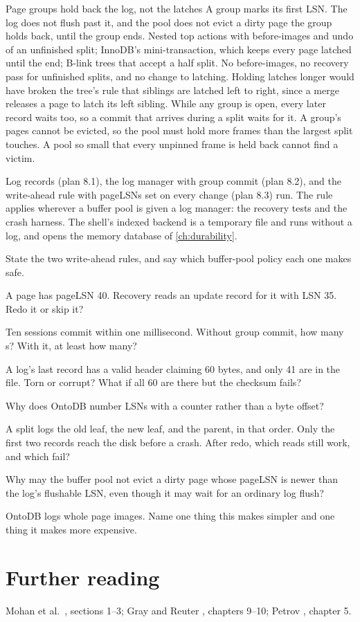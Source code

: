 \begin{decision}{Page groups hold back the log, not the latches}
 A group marks its first LSN. The log does not flush past it, and
the pool does not evict a dirty page the group holds back, until the group
ends.
 Nested top actions with before-images and undo of an
unfinished split; InnoDB's mini-transaction, which keeps every page latched
until the end; B-link trees that accept a half split.
 No before-images, no recovery pass for unfinished splits, and no
change to latching. Holding latches longer would have broken the tree's rule
that siblings are latched left to right, since a merge releases a page to
latch its left sibling.
 While any group is open, every later record waits too, so a
commit that arrives during a split waits for it. A group's pages cannot be
evicted, so the pool must hold more frames than the largest split touches. A
pool so small that every unpinned frame is held back cannot find a victim.
\end{decision}

\begin{status}
Log records (plan 8.1), the log manager with group commit (plan 8.2), and the
write-ahead rule with pageLSNs set on every change (plan 8.3) run. The rule
applies wherever a buffer pool is given a log manager: the recovery tests and
the crash harness. The shell's indexed backend is a temporary file and runs
without a log, and  opens the memory database of
\cref{ch:durability}.
\end{status}

\begin{checkyourself}
\item State the two write-ahead rules, and say which buffer-pool policy each one makes safe.
\item A page has pageLSN 40. Recovery reads an update record for it with LSN 35. Redo it or skip it?
\item Ten sessions commit within one millisecond. Without group commit, how many s? With it, at least how many?
\item A log's last record has a valid header claiming 60 bytes, and only 41 are in the file. Torn or corrupt? What if all 60 are there but the checksum fails?
\item Why does OntoDB number LSNs with a counter rather than a byte offset?
\item A split logs the old leaf, the new leaf, and the parent, in that order. Only the first two records reach the disk before a crash. After redo, which reads still work, and which fail?
\item Why may the buffer pool not evict a dirty page whose pageLSN is newer than the log's flushable LSN, even though it may wait for an ordinary log flush?
\item OntoDB logs whole page images. Name one thing this makes simpler and one thing it makes more expensive.
\end{checkyourself}

\section*{Further reading}
Mohan et al.\ \cite{aries}, sections 1--3; Gray and Reuter \cite{grayreuter},
chapters 9--10; Petrov \cite{petrov}, chapter 5.
